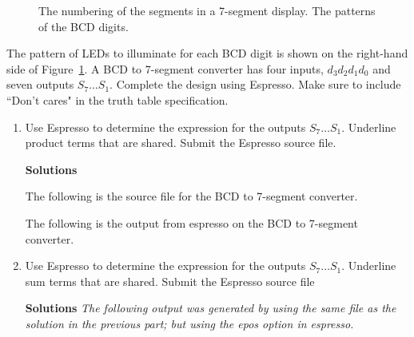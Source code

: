 \begin{enumerate}
            \begin{figure}[ht]
                \caption{The numbering of the segments in a 7-segment display.
                The patterns of the BCD digits.}
                \label{fig:BCD}
            \end{figure}

            The pattern of LEDs to illuminate for each BCD digit is shown on the
            right-hand side of Figure~\ref{fig:BCD}.  A BCD to 7-segment converter
            has four inputs, $d_3 d_2 d_1 d_0$ and seven outputs $S_7 \ldots S_1$.
            Complete the design using Espresso.  Make sure to include ``Don't cares"
            in the truth table specification.
            \begin{enumerate}
                \item Use Espresso to determine the \SOPmin expression for the outputs
                    $S_7 \ldots S_1$.  Underline product terms that are shared.
                    Submit the Espresso source file.

                    \begin{onlysolution} \textbf{Solutions} \itshape{
                            The following is the source file for the BCD to 7-segment {converter. \color{blue}}

                            The following is the output from espresso on the
                            BCD to 7-segment converter. {\color{blue}}
                        }
                    \end{onlysolution}

                \item Use Espresso to determine the \POSmin expression for the outputs
                    $S_7 \ldots S_1$.  Underline sum terms that are shared.
                    Submit the Espresso source file
                    \begin{onlysolution} \textbf{Solutions} \itshape {
                            The following output was generated by using the same file
                            as the solution in the previous part; but using the epos
                        option in espresso.} {\color{blue}}



\end{onlysolution}
\end{enumerate}
\end{enumerate}
